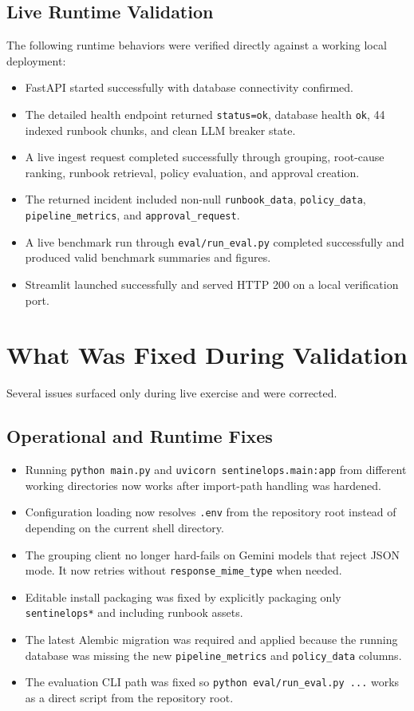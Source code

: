 \documentclass[11pt]{article}
\begin{document}
\subsection{Live Runtime Validation}
The following runtime behaviors were verified directly against a working local deployment:
\begin{itemize}[leftmargin=*]
\item FastAPI started successfully with database connectivity confirmed.
\item The detailed health endpoint returned \texttt{status=ok}, database health \texttt{ok}, 44 indexed runbook chunks, and clean LLM breaker state.
\item A live ingest request completed successfully through grouping, root-cause ranking, runbook retrieval, policy evaluation, and approval creation.
\item The returned incident included non-null \texttt{runbook\_data}, \texttt{policy\_data}, \texttt{pipeline\_metrics}, and \texttt{approval\_request}.
\item A live benchmark run through \texttt{eval/run\_eval.py} completed successfully and produced valid benchmark summaries and figures.
\item Streamlit launched successfully and served HTTP 200 on a local verification port.
\end{itemize}

\section{What Was Fixed During Validation}
Several issues surfaced only during live exercise and were corrected.

\subsection{Operational and Runtime Fixes}
\begin{itemize}[leftmargin=*]
\item Running \texttt{python main.py} and \texttt{uvicorn sentinelops.main:app} from different working directories now works after import-path handling was hardened.
\item Configuration loading now resolves \texttt{.env} from the repository root instead of depending on the current shell directory.
\item The grouping client no longer hard-fails on Gemini models that reject JSON mode. It now retries without \texttt{response\_mime\_type} when needed.
\item Editable install packaging was fixed by explicitly packaging only \texttt{sentinelops*} and including runbook assets.
\item The latest Alembic migration was required and applied because the running database was missing the new \texttt{pipeline\_metrics} and \texttt{policy\_data} columns.
\item The evaluation CLI path was fixed so \texttt{python eval/run\_eval.py ...} works as a direct script from the repository root.
\end{itemize}
\end{document}
